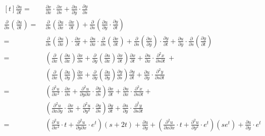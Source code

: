 \documentclass[11pt,fleqn]{book} %
\begin{document}
$\begin{aligned}[t]
    \frac{\partial u}{\partial t} 
    =&~ \frac{\partial x}{\partial x} \cdot \frac{\partial x}{\partial s} + \frac{\partial u}{\partial y} \cdot \frac{\partial y}{\partial s} \\
    \frac{\partial}{\partial s} \left( \frac{\partial u}{\partial t} \right) 
    =&~ \frac{\partial}{\partial s} \left( \frac{\partial u}{\partial x} \cdot \frac{\partial x}{\partial t} \right) + \frac{\partial}{\partial s} \left( \frac{\partial u}{\partial y} \cdot \frac{\partial y}{\partial t} \right) \\
    =&~ \frac{\partial}{\partial s} \left( \frac{\partial u}{\partial x} \right) \cdot \frac{\partial x}{\partial t} + \frac{\partial u}{\partial x} \cdot \frac{\partial}{\partial s} \left( \frac{\partial x}{\partial t} \right) + \frac{\partial}{\partial s} \left( \frac{\partial u}{\partial y} \right) \cdot \frac{\partial y}{\partial t} + \frac{\partial u}{\partial y} \cdot \frac{\partial}{\partial s} \left( \frac{\partial y}{\partial t} \right) \\
    =&~ \left( \frac{\partial}{\partial x} \left( \frac{\partial u}{\partial x} \right) \frac{\partial x}{\partial s} + \frac{\partial}{\partial y} \left( \frac{\partial u}{\partial x} \right) \frac{\partial x}{\partial t} \right) \frac{\partial x}{\partial t} + \frac{\partial u}{\partial x} \cdot \frac{\partial^2 x}{\partial s \partial t} ~+ \\ &~ \left( \frac{\partial}{\partial x} \left( \frac{\partial u}{\partial y} \right) \frac{\partial x}{\partial s} + \frac{\partial}{\partial y} \left( \frac{\partial u}{\partial y} \right) \frac{\partial y}{\partial s} \right) \frac{\partial y}{\partial t} + \frac{\partial u}{\partial y} \cdot \frac{\partial^2 y}{\partial s \partial t} \\
    =&~ \left( \frac{\partial^2 u}{\partial x^2} \cdot \frac{\partial x}{\partial s} + \frac{\partial ^2 u}{\partial y \partial x} \cdot \frac{\partial y}{\partial s} \right) \frac{\partial x}{\partial t} + \frac{\partial u}{\partial x} \cdot \frac{\partial^2 x}{\partial s \partial t} + \\ &~ \left( \frac{\partial^2 u}{\partial x \partial y} \cdot \frac{\partial x}{\partial s} + \frac{\partial^2 u}{\partial y^2} \cdot \frac{\partial y}{\partial s} \right) \frac{\partial y}{\partial t} + \frac{\partial u}{\partial y} \cdot \frac{\partial^2 y}{\partial s \partial t} \\
    =&~ \left( \frac{\partial^2 u}{\partial x^2} \cdot t + \frac{\partial^2 u}{\partial y \partial x} \cdot e^t \right) (s + 2t) + \frac{\partial u}{\partial y} + \left( \frac{\partial^2 u}{\partial x \partial x} \cdot t + \frac{\partial^2 u}{\partial y^2} \cdot e^t \right) (se^t) + \frac{\partial u}{\partial y} \cdot e^t
\end{aligned}$
\end{document}

